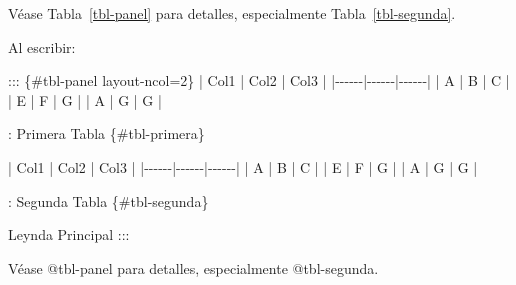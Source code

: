 \documentclass[
  letterpaper,
  DIV=11,
  numbers=noendperiod]{scrartcl}
\newenvironment{Shaded}{\begin{snugshade}}{\end{snugshade}}
\newcommand{\NormalTok}[1]{\textcolor[rgb]{0.00,0.23,0.31}{#1}}
\begin{document}
\begin{table}

\caption{\label{tbl-panel}Leynda Principal}

\begin{minipage}{0.50\linewidth}



\end{minipage}%
%
\begin{minipage}{0.50\linewidth}



\end{minipage}%

\end{table}%

Véase Tabla~\ref{tbl-panel} para detalles, especialmente
Tabla~\ref{tbl-segunda}.

Al escribir:

\begin{Shaded}
\begin{Highlighting}[]
\NormalTok{::: \{\#tbl{-}panel layout{-}ncol=2\}}
\NormalTok{| Col1 | Col2 | Col3 |}
\NormalTok{|{-}{-}{-}{-}{-}{-}|{-}{-}{-}{-}{-}{-}|{-}{-}{-}{-}{-}{-}|}
\NormalTok{| A    | B    | C    |}
\NormalTok{| E    | F    | G    |}
\NormalTok{| A    | G    | G    |}

\NormalTok{: Primera Tabla \{\#tbl{-}primera\}}

\NormalTok{| Col1 | Col2 | Col3 |}
\NormalTok{|{-}{-}{-}{-}{-}{-}|{-}{-}{-}{-}{-}{-}|{-}{-}{-}{-}{-}{-}|}
\NormalTok{| A    | B    | C    |}
\NormalTok{| E    | F    | G    |}
\NormalTok{| A    | G    | G    |}

\NormalTok{: Segunda Tabla \{\#tbl{-}segunda\}}

\NormalTok{Leynda Principal}
\NormalTok{:::}

\NormalTok{Véase @tbl{-}panel para detalles, especialmente @tbl{-}segunda.}
\end{Highlighting}
\end{Shaded}
\end{document}
